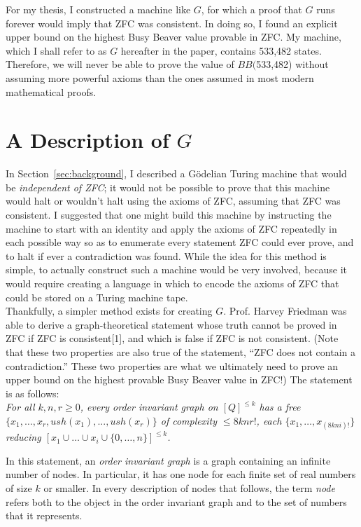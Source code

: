 \documentclass{report}
\newcommand{\statenum}{533,482 }
\newcommand{\bbstatenum}{$BB($533,482) }
\begin{document}
For my thesis, I constructed a machine like $G$, for which a proof that $G$ runs forever would imply that ZFC was consistent. In doing so, I found an explicit upper bound on the highest Busy Beaver value provable in ZFC. My machine, which I shall refer to as $G$ hereafter in the paper, contains \statenum states. Therefore, we will never be able to prove the value of \bbstatenum without assuming more powerful axioms than the ones assumed in most modern mathematical proofs.

\section{A Description of $G$}

In Section~\ref{sec:background}, I described a G\"{o}delian Turing machine that would be \emph{independent of ZFC}; it would not be possible to prove that this machine would halt or wouldn't halt using the axioms of ZFC, assuming that ZFC was consistent. I suggested that one might build this machine by instructing the machine to start with an identity and apply the axioms of ZFC repeatedly in each possible way so as to enumerate every statement ZFC could ever prove, and to halt if ever a contradiction was found. While the idea for this method is simple, to actually construct such a machine would be very involved, because it would require creating a language in which to encode the axioms of ZFC that could be stored on a Turing machine tape. \\

Thankfully, a simpler method exists for creating $G$. Prof. Harvey Friedman was able to derive a graph-theoretical statement whose truth cannot be proved in ZFC if ZFC is consistent[1], and which is false if ZFC is not consistent. (Note that these two properties are also true of the statement, ``ZFC does not contain a contradiction.'' These two properties are what we ultimately need to prove an upper bound on the highest provable Busy Beaver value in ZFC!) The statement is as follows: \\

\emph{For all $k, n, r \ge 0$, every order invariant graph on $[Q]^{\le k}$ has a free $\{x_1,\dots,x_r,ush(x_1),...,ush(x_r)\}$ of complexity $\le 8knr!$, each
$\{x_1, \dots, x_{(8kni)!}\}$ reducing $[x_1 \cup \dots \cup x_i \cup \{0,\dots,n\}]^{\le k}$.}

In this statement, an \emph{order invariant graph} is a graph containing an infinite number of nodes. In particular, it has one node for each finite set of real numbers of size $k$ or smaller. In every description of nodes that follows, the term \emph{node} refers both to the object in the order invariant graph and to the set of numbers that it represents. \\
\end{document}
